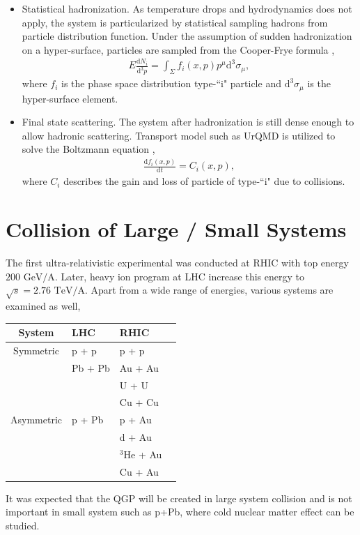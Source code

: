 \documentclass[aps,prl,twocolumn,groupedaddress]{revtex4-1}
\begin{document}
\begin{itemize}
		\item Statistical hadronization. 
		As temperature drops and hydrodynamics does not apply, the system is particularized by statistical sampling hadrons from particle distribution function. 
		Under the assumption of sudden hadronization on a hyper-surface, particles are sampled from the Cooper-Frye formula \citep{Cooper:1974Freezeout},
		\begin{eqnarray}
			E\frac{\mathrm{d}N_i}{\mathrm{d}^3p} = \int_\Sigma f_i(x, p)p^\mu\mathrm{d}^3\sigma_\mu,
		\end{eqnarray}
		where $f_i$ is the phase space distribution type-``i" particle and $\mathrm{d}^3\sigma_\mu$ is the hyper-surface element.
			
		\item Final state scattering. 
		The system after hadronization is still dense enough to allow hadronic scattering. 
		Transport model such as UrQMD is utilized to solve the Boltzmann equation \citep{Bass:1998UrQMD-1, Bleicher:1998UrQMD-2},
		\begin{eqnarray}
			\frac{\mathrm{d}f_i(x, p)}{\mathrm{d}t} = C_i(x, p),
		\end{eqnarray}
	where $C_i$ describes the gain and loss of particle of type-``i" due to collisions. 
	\end{itemize}
	


\section{Collision of Large / Small Systems}
The first ultra-relativistic experimental was conducted at RHIC with top energy $200 \textrm{ GeV/A}$. 
Later, heavy ion program at LHC increase this energy to $\sqrt{s} = 2.76 \textrm{ TeV/A}$. 
Apart from a wide range of energies, various systems are examined as well,
\begin{center}
	\begin{tabularx}{0.5\textwidth}{c *{3}{Y}}
	\toprule[1pt]
	System 		& LHC 		 &	RHIC\\
	\midrule[0.5pt]
	Symmetric 	& p + p		 & 	 p + p \\
			 	& Pb + Pb	 & 	 Au + Au \\
			 	&			 & 	 U + U \\
			 	&			 & 	 Cu + Cu \\
	Asymmetric 	& p + Pb	 	 & 	 p + Au \\
			 	&			 & 	 d + Au \\
			 	&			 & 	 ${}^3$He + Au \\
			 	&			 & 	 Cu + Au \\
	\bottomrule[1pt]
	\end{tabularx}
\end{center}
It was expected that the QGP will be created in large system collision and is not important in small system such as p+Pb, where cold nuclear matter effect can be studied.
\end{document}
